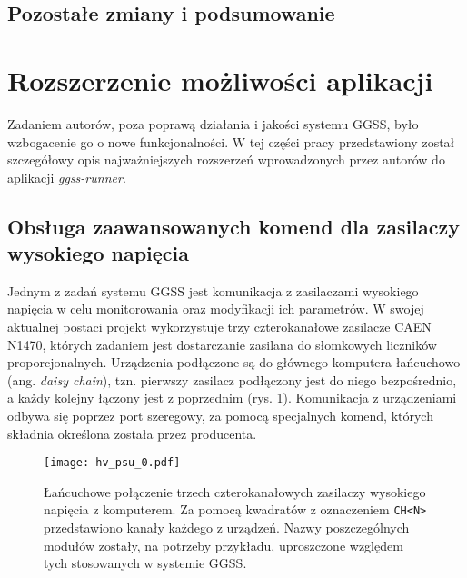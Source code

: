 \subsection{Pozostałe zmiany i podsumowanie}

\clearpage
\section{Rozszerzenie możliwości aplikacji}
Zadaniem autorów, poza poprawą działania i jakości systemu GGSS, było wzbogacenie go o nowe funkcjonalności. W tej części pracy przedstawiony został szczegółowy opis najważniejszych rozszerzeń wprowadzonych przez autorów do aplikacji \emph{ggss-runner}. 

\subsection{Obsługa zaawansowanych komend dla zasilaczy wysokiego napięcia} \label{ch:hv}
Jednym z zadań systemu GGSS jest komunikacja z zasilaczami wysokiego napięcia w celu monitorowania oraz modyfikacji ich parametrów. W swojej aktualnej postaci projekt wykorzystuje trzy czterokanałowe zasilacze CAEN N1470, których zadaniem jest dostarczanie zasilana do słomkowych liczników proporcjonalnych. Urządzenia podłączone są do głównego komputera łańcuchowo (ang. \emph{daisy chain}), tzn. pierwszy zasilacz podłączony jest do niego bezpośrednio, a każdy kolejny łączony jest z poprzednim (rys. \ref{fig:psu0}). Komunikacja z urządzeniami odbywa się poprzez port szeregowy, za pomocą specjalnych komend, których składnia określona została przez producenta. 

\begin{figure}[H]
\centering
\texttt{[image: hv\_psu\_0.pdf]}
\caption{Łańcuchowe połączenie trzech czterokanałowych zasilaczy wysokiego napięcia z komputerem. Za pomocą kwadratów z oznaczeniem \lstinline{CH<N>} przedstawiono kanały każdego z urządzeń. Nazwy poszczególnych modułów zostały, na potrzeby przykładu, uproszczone względem tych stosowanych w systemie GGSS.}
\label{fig:psu0}
\end{figure}

